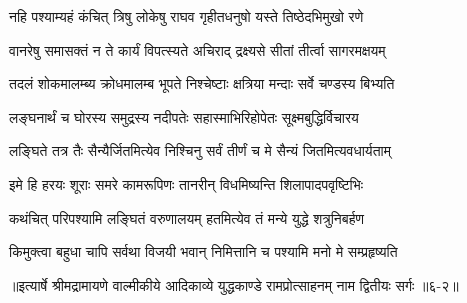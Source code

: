 \twolineshloka
{नहि पश्याम्यहं कंचित् त्रिषु लोकेषु राघव}
{गृहीतधनुषो यस्ते तिष्ठेदभिमुखो रणे} %

\twolineshloka
{वानरेषु समासक्तं न ते कार्यं विपत्स्यते}
{अचिराद् द्रक्ष्यसे सीतां तीर्त्वा सागरमक्षयम्} %

\twolineshloka
{तदलं शोकमालम्ब्य क्रोधमालम्ब भूपते}
{निश्चेष्टाः क्षत्रिया मन्दाः सर्वे चण्डस्य बिभ्यति} %

\twolineshloka
{लङ्घनार्थं च घोरस्य समुद्रस्य नदीपतेः}
{सहास्माभिरिहोपेतः सूक्ष्मबुद्धिर्विचारय} %

\twolineshloka
{लङ्घिते तत्र तैः सैन्यैर्जितमित्येव निश्चिनु}
{सर्वं तीर्णं च मे सैन्यं जितमित्यवधार्यताम्} %

\twolineshloka
{इमे हि हरयः शूराः समरे कामरूपिणः}
{तानरीन् विधमिष्यन्ति शिलापादपवृष्टिभिः} %

\twolineshloka
{कथंचित् परिपश्यामि लङ्घितं वरुणालयम्}
{हतमित्येव तं मन्ये युद्धे शत्रुनिबर्हण} %

\twolineshloka
{किमुक्त्वा बहुधा चापि सर्वथा विजयी भवान्}
{निमित्तानि च पश्यामि मनो मे सम्प्रहृष्यति} %


॥इत्यार्षे श्रीमद्रामायणे वाल्मीकीये आदिकाव्ये युद्धकाण्डे रामप्रोत्साहनम् नाम द्वितीयः सर्गः ॥६-२॥

